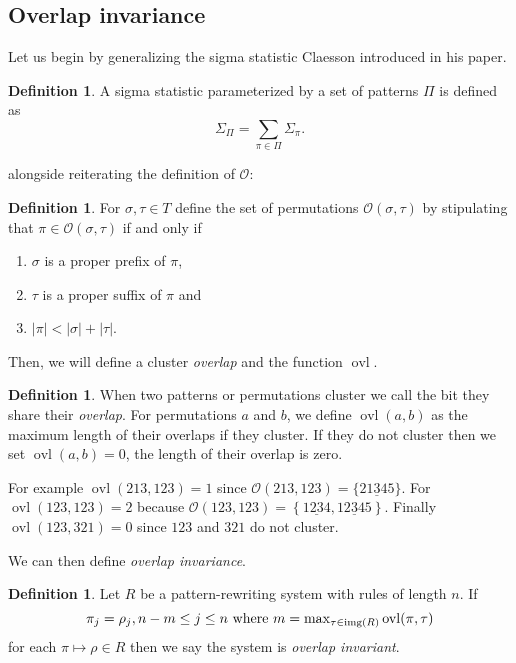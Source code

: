 \documentclass[a4paper, 11pt, english]{article}
\newcommand{\patternrule}{ \mapsto \!}
\theoremstyle{definition}
\newtheorem{definition}[theorem]{Definition}
\newcommand{\Ocal}{\mathcal{O}}
\DeclareMathOperator{\img}{img}
\DeclareMathOperator{\ovl}{ovl}
\begin{document}
\subsection{Overlap invariance}
Let us begin by generalizing the sigma statistic Claesson introduced in his paper.
\begin{definition}
    A sigma statistic parameterized by a set of patterns $\Pi$ is defined as
    $$
        \Sigma_\Pi = \sum_{\pi \in \Pi} \Sigma_{\pi}.
    $$
\end{definition}
alongside reiterating the definition of $\Ocal$:
\begin{definition}
    For $\sigma, \tau \in T$ define the set of permutations $\Ocal(\sigma,
    \tau)$ by stipulating that $\pi \in \Ocal(\sigma, \tau)$ if and only if
    \begin{enumerate}
    \item $\sigma$ is a proper prefix of $\pi$,
    \item $\tau$ is a proper suffix of $\pi$ and
    \item $|\pi| < |\sigma| + |\tau|$.
    \end{enumerate}
\end{definition}

Then, we will define a cluster \emph{overlap} and the function $\ovl$.
\begin{definition}
  When two patterns or permutations cluster we call the bit they share their \emph{overlap}.
  For permutations $a$ and $b$, we define $\ovl(a,b)$ as the maximum length of their overlaps if they 
  cluster. If they do not cluster then we set $\ovl(a,b)=0$, the length of their overlap is zero.

  For example $\ovl(213, 123) = 1$ since $\Ocal(213, 123) = \{ 21\underline{3}45 \}$. For $\ovl(123, 123) = 2$
  because $\Ocal(123, 123) = \left\{ 1\underline{23}4, 12\underline{3}45 \right\}$. Finally
  $\ovl(123, 321)=0$ since $123$ and $321$ do not cluster.
\end{definition}

We can then define \emph{overlap invariance}.
\begin{definition}
    Let $R$ be a pattern-rewriting system with rules of length $n$. If
    \[
        \pi_j = \rho_j, n-m \leq j \leq n \  \textnormal{where}
        \ m = \max\nolimits_{\tau \in \img(R)} \ovl(\pi, \tau)
    \]
    for each $\pi \patternrule \rho \in R$ then we say the system is \emph{overlap invariant}.
\end{definition}
\end{document}
